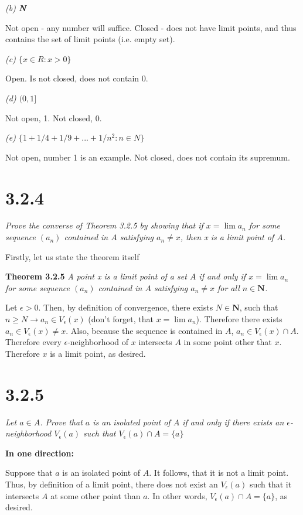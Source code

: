 \documentclass[11pt,oneside,titlepage]{book}
\begin{document}
\textit{(b) \textbf{N}}

Not open - any number will suffice. Closed - does not have limit points, and
thus contains the set of limit points (i.e. empty set).

\textit{(c) $\{x \in R: x > 0\}$}

Open. Is not closed, does not contain 0.

\textit{(d) $(0,1]$}

Not open, 1. Not closed, 0.

\textit{(e) $\{1 + 1/4 + 1/9 + ... + 1/n^2: n \in N\}$}

Not open, number 1 is an example. Not closed, does not contain its supremum.


\section*{3.2.4}
\textit{Prove the converse of Theorem 3.2.5 by showing that if
  $x = \lim a_n$ for some sequence $(a_n)$ contained in $A$ satisfying
  $a_n \neq x$, then x is a limit point of $A$.}

Firstly, let us state the theorem itself

\textbf{Theorem 3.2.5}
\textit{A point x is a limit point of a set $A$ if and only if $x = \lim a_n$
  for some sequence $(a_n)$ contained in $A$ satisfying $a_n \neq x$ for all
  $n \in \textbf{N}$.}

Let  $\epsilon > 0$. Then, by definition of convergence, there
exists $N \in \textbf{N}$, such that $n \geq N \to a_n \in V_\epsilon(x)$
(don't forget, that $x = \lim a_n$). Therefore there exists
$a_n \in V_\epsilon(x) \neq x $. Also, because the sequence is contained in
$A$, $a_n \in V_\epsilon(x) \cap A$.  Therefore every $\epsilon$-neighborhood
of $x$ intersects  $A$ in some point other that $x$. Therefore $x$ is a limit
point, as desired.

\section*{3.2.5}
\textit{Let $a \in A$. Prove that $a$ is an isolated point of $A$ if and only
  if there exists an $\epsilon$-neighborhood $V_\epsilon(a)$ such that
  $V_\epsilon(a) \cap A = \{a\}$ }

\textbf{In one direction:}

Suppose that $a$ is an isolated point of $A$. It follows, that it is not a
limit point. Thus, by definition of a limit point, there does not exist an
$V_\epsilon(a)$ such that it intersects $A$ at some other point than $a$.
In other words, $V_\epsilon(a) \cap A = \{a\}$, as desired.
\end{document}
